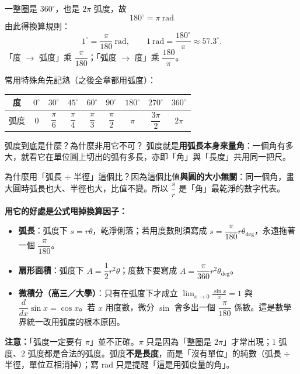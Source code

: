 \documentclass[11pt]{article}
\begin{document}
一整圈是 $360^\circ$，也是 $2\pi$ 弧度，故
$$\boxed{\;180^\circ=\pi\ \text{rad}\;}$$
由此得換算規則：
$$1^\circ=\frac{\pi}{180}\ \text{rad},\qquad 1\ \text{rad}=\frac{180^\circ}{\pi}\approx 57.3^\circ.$$
「度 $\rightarrow$ 弧度」乘 $\dfrac{\pi}{180}$；「弧度 $\rightarrow$ 度」乘 $\dfrac{180}{\pi}$。

常用特殊角先記熟（之後全章都用弧度）：

\begin{center}
\renewcommand{\arraystretch}{1.5}
\begin{tabular}{c|cccccccc}
\hline
度 & $0^\circ$ & $30^\circ$ & $45^\circ$ & $60^\circ$ & $90^\circ$ & $180^\circ$ & $270^\circ$ & $360^\circ$ \\
\hline
弧度 & $0$ & $\dfrac{\pi}{6}$ & $\dfrac{\pi}{4}$ & $\dfrac{\pi}{3}$ & $\dfrac{\pi}{2}$ & $\pi$ & $\dfrac{3\pi}{2}$ & $2\pi$ \\
\hline
\end{tabular}
\end{center}

\begin{補充框}{弧度到底是什麼？為什麼非用它不可？}
弧度就是\textbf{用弧長本身來量角}：一個角有多大，就看它在單位圓上切出的弧有多長，亦即「角」與「長度」共用同一把尺。

為什麼用「弧長 $\div$ 半徑」這個比？因為這個比值\textbf{與圓的大小無關}：同一個角，畫大圓時弧長也大、半徑也大，比值不變。所以 $\dfrac{s}{r}$ 是「角」最乾淨的數字代表。

\textbf{用它的好處是公式甩掉換算因子：}
\begin{itemize}\setlength{\itemsep}{1pt}
\item \textbf{弧長}：弧度下 $s=r\theta$，乾淨俐落；若用度數則須寫成 $s=\dfrac{\pi}{180}r\theta_{\deg}$，永遠拖著一個 $\dfrac{\pi}{180}$。
\item \textbf{扇形面積}：弧度下 $A=\dfrac12 r^2\theta$；度數下要寫成 $A=\dfrac{\pi}{360}r^2\theta_{\deg}$。
\item \textbf{微積分（高三／大學）}：只有在弧度下才成立 $\displaystyle\lim_{x\to0}\frac{\sin x}{x}=1$ 與 $\dfrac{d}{dx}\sin x=\cos x$。若 $x$ 用度數，微分 $\sin$ 會多出一個 $\dfrac{\pi}{180}$ 係數。這是數學界統一改用弧度的根本原因。
\end{itemize}

\textbf{注意：}「弧度一定要有 $\pi$」並不正確。$\pi$ 只是因為「整圈是 $2\pi$」才常出現；$1$ 弧度、$2$ 弧度都是合法的弧度。弧度\textbf{不是長度}，而是「沒有單位」的純數（弧長 $\div$ 半徑，單位互相消掉）；寫 rad 只是提醒「這是用弧度量的角」。
\end{補充框}
\end{document}
